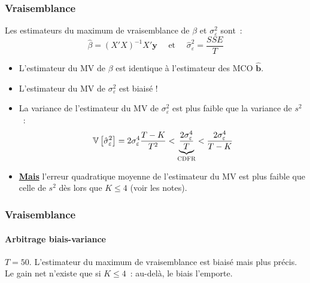 \documentclass[10pt]{beamer}
\begin{document}
\begin{frame}
  \frametitle{Vraisemblance}

  \begin{prop}\label{prop:ml}
    Les estimateurs du maximum de vraisemblance de $\beta$ et $\sigma_{\varepsilon}^2$ sont~:
    \[
      \hat\beta = (X'X)^{-1}X'\mathbf y \quad\text{ et }\quad \hat{\sigma}_{\varepsilon}^2 = \frac{SSE}{T}
    \]
  \end{prop}

  \begin{itemize}

  \item L'estimateur du MV de $\beta$ est identique à l'estimateur des MCO $\hat{\mathbf b}$.\newline

  \item L'estimateur du MV de $\sigma_{\varepsilon}^{2}$ est biaisé !\newline

  \item La variance de l'estimateur du MV de $\sigma_{\varepsilon}^{2}$ est plus faible que la variance de $s^2$~:
    \[
      \mathbb V\left[ \hat{\sigma}_{\varepsilon}^2 \right] = 2\sigma_{\varepsilon}^4\frac{T-K}{T^2} < \underbrace{\frac{2\sigma_{\varepsilon}^4}{T}}_{\textsc{CDFR}}< \frac{2\sigma_{\varepsilon}^4}{T-K}
    \]
  \item \underline{\textbf{Mais}} l'erreur quadratique moyenne de l'estimateur du MV est plus faible que celle de $s^2$ dès lors que $K\leq 4$ (voir les notes).

  \end{itemize}

\end{frame}


\begin{frame}[c]
  \frametitle{Vraisemblance}
  \framesubtitle{Arbitrage biais-variance}

  \begin{center}
    \scalebox{.80}{}
  \end{center}

  \medskip

  {\small $T=50$. L'estimateur du maximum de vraisemblance est biaisé mais plus
    précis. Le gain net n'existe que si $K\leq 4$~: au-delà, le biais l'emporte.}

\end{frame}
\end{document}
